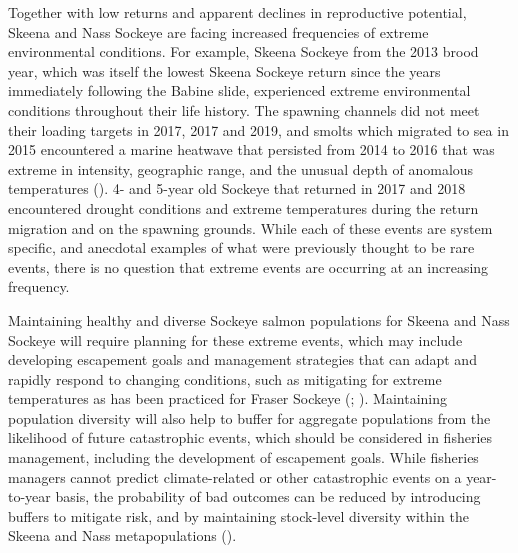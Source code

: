 \documentclass[french,11pt]{book}
\begin{document}
Together with low returns and apparent declines in reproductive potential, Skeena and Nass Sockeye are facing increased frequencies of extreme environmental conditions. For example, Skeena Sockeye from the 2013 brood year, which was itself the lowest Skeena Sockeye return since the years immediately following the Babine slide, experienced extreme environmental conditions throughout their life history. The spawning channels did not meet their loading targets in 2017, 2017 and 2019, and smolts which migrated to sea in 2015 encountered a marine heatwave that persisted from 2014 to 2016 that was extreme in intensity, geographic range, and the unusual depth of anomalous temperatures (). 4- and 5-year old Sockeye that returned in 2017 and 2018 encountered drought conditions and extreme temperatures during the return migration and on the spawning grounds. While each of these events are system specific, and anecdotal examples of what were previously thought to be rare events, there is no question that extreme events are occurring at an increasing frequency.

Maintaining healthy and diverse Sockeye salmon populations for Skeena and Nass Sockeye will require planning for these extreme events, which may include developing escapement goals and management strategies that can adapt and rapidly respond to changing conditions, such as mitigating for extreme temperatures as has been practiced for Fraser Sockeye (; ). Maintaining population diversity will also help to buffer for aggregate populations from the likelihood of future catastrophic events, which should be considered in fisheries management, including the development of escapement goals. While fisheries managers cannot predict climate-related or other catastrophic events on a year-to-year basis, the probability of bad outcomes can be reduced by introducing buffers to mitigate risk, and by maintaining stock-level diversity within the Skeena and Nass metapopulations ().
\end{document}
